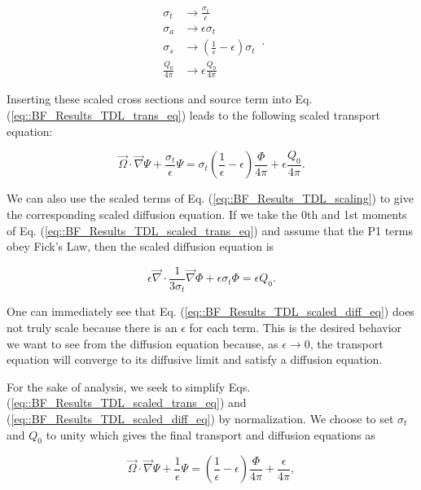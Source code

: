 \begin{equation}
\label{eq::BF_Results_TDL_scaling}
\begin{aligned}
	\sigma_t &\rightarrow \frac{\sigma_t}{\epsilon} \\
	\sigma_a &\rightarrow \epsilon \sigma_t\\
	\sigma_s &\rightarrow \left( \frac{1}{\epsilon} - \epsilon   \right) \sigma_t \\
	\frac{Q_0}{4 \pi} &\rightarrow \epsilon \frac{Q_0}{4 \pi}
\end{aligned} \, .
\end{equation}

\noindent Inserting these scaled cross sections and source term into Eq. (\ref{eq::BF_Results_TDL_trans_eq}) leads to the following scaled transport equation:

\begin{equation}
\label{eq::BF_Results_TDL_scaled_trans_eq}
\vec{\Omega} \cdot \vec{\nabla} \Psi + \frac{\sigma_t}{\epsilon} \Psi = \sigma_t \left( \frac{1}{\epsilon} - \epsilon   \right)  \frac{\Phi}{4 \pi} + \epsilon \frac{Q_0}{4 \pi} .
\end{equation}

\noindent We can also use the scaled terms of Eq. (\ref{eq::BF_Results_TDL_scaling}) to give the corresponding scaled diffusion equation. If we take the 0th and 1st moments of Eq. (\ref{eq::BF_Results_TDL_scaled_trans_eq}) and assume that the P1 terms obey Fick's Law, then the scaled diffusion equation is

\begin{equation}
\label{eq::BF_Results_TDL_scaled_diff_eq}
\epsilon \vec{\nabla} \cdot \frac{1}{3 \sigma_t}  \vec{\nabla} \Phi + \epsilon \sigma_t \Phi =  \epsilon Q_0.
\end{equation}

\noindent One can immediately see that Eq. (\ref{eq::BF_Results_TDL_scaled_diff_eq}) does not truly scale because there is an $\epsilon$ for each term. This is the desired behavior we want to see from the diffusion equation because, as $\epsilon \rightarrow 0$, the transport equation will converge to its diffusive limit and satisfy a diffusion equation.

For the sake of analysis, we seek to simplify Eqs. (\ref{eq::BF_Results_TDL_scaled_trans_eq}) and (\ref{eq::BF_Results_TDL_scaled_diff_eq}) by normalization. We choose to set $\sigma_t$ and $Q_0$ to unity which gives the final transport and diffusion equations as  

\begin{equation}
\label{eq::BF_Results_TDL_normalized_trans_eq}
\vec{\Omega} \cdot \vec{\nabla} \Psi + \frac{1}{\epsilon} \Psi =  \left( \frac{1}{\epsilon} - \epsilon   \right)  \frac{\Phi}{4 \pi} +  \frac{\epsilon}{4 \pi} ,
\end{equation}

